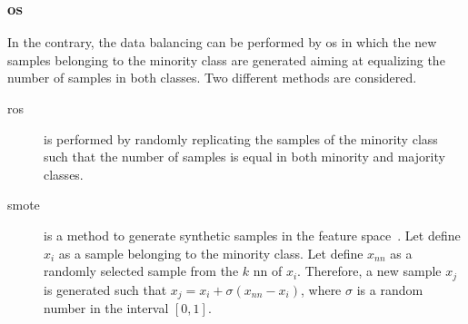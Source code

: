\subsubsection{\acl{os}}

\noindent In the contrary, the data balancing can be performed by \ac{os} in which the new samples belonging to the minority class are generated aiming at equalizing the number of samples in both classes.
Two different methods are considered.

\begin{description}
\item[\Ac{ros}] is performed by randomly replicating the samples of the minority class such that the number of samples is equal in both minority and majority classes.
\end{description}



\begin{description}
\item[\Ac{smote}] is a method to generate synthetic samples in the feature space~\cite{chawla2002smote}.
Let define $x_i$ as a sample belonging to the minority class.
Let define $x_{nn}$ as a randomly selected sample from the $k$ \ac{nn} of $x_i$.
Therefore, a new sample $x_j$ is generated such that $x_j = x_i + \sigma \left( x_{nn} - x_i \right)$, where $\sigma$ is a random number in the interval $\left[0,1\right]$.
\end{description}


